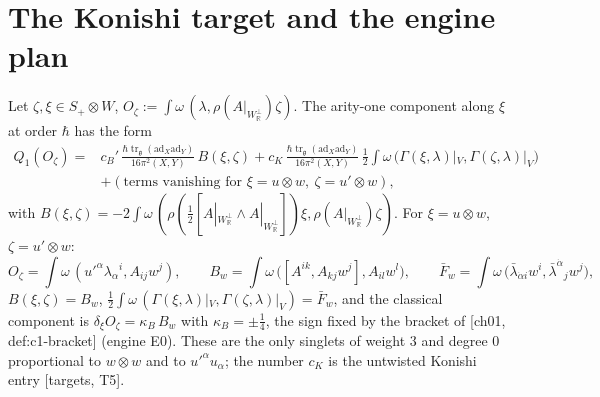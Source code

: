 \section{The Konishi target and the engine plan}

\begin{proposition}
\label{prop:o-konishi}
Let $\zeta,\xi\in S_+\otimes W$, $O_\zeta:=\int\omega\,(\lambda,\rho(A|_{W_{\mathbb R}^\perp})\zeta)$. The arity-one component along $\xi$ at order $\hbar$ has the form
\begin{equation}
\begin{aligned}
Q_1(O_\zeta)={}&c_B'\,\frac{\hbar\operatorname{tr}_{\mathfrak g}(\mathrm{ad}_X\mathrm{ad}_Y)}{16\pi^2(X,Y)}\,B(\xi,\zeta)+c_K\,\frac{\hbar\operatorname{tr}_{\mathfrak g}(\mathrm{ad}_X\mathrm{ad}_Y)}{16\pi^2(X,Y)}\,\tfrac12\int\omega\,\big(\Gamma(\xi,\lambda)|_V,\Gamma(\zeta,\lambda)|_V\big)\\
&+(\text{terms vanishing for }\xi=u\otimes w,\ \zeta=u'\otimes w),
\end{aligned}
\label{eq:o-konishi}
\end{equation}
with $B(\xi,\zeta)=-2\int\omega\,(\rho(\tfrac12[A|_{W_{\mathbb R}^\perp}\wedge A|_{W_{\mathbb R}^\perp}])\xi,\rho(A|_{W_{\mathbb R}^\perp})\zeta)$. For $\xi=u\otimes w$, $\zeta=u'\otimes w$:
\begin{equation}
O_\zeta=\int\omega\,(u'^\alpha\lambda_\alpha{}^i,A_{ij}w^j),\qquad B_w=\int\omega\,\big([A^{ik},A_{kj}w^j],A_{il}w^l\big),\qquad \bar F_w=\int\omega\,\big(\bar\lambda_{\dot\alpha i}w^i,\bar\lambda^{\dot\alpha}{}_jw^j\big),
\label{eq:o-BF}
\end{equation}
$B(\xi,\zeta)=B_w$, $\tfrac12\int\omega\,(\Gamma(\xi,\lambda)|_V,\Gamma(\zeta,\lambda)|_V)=\bar F_w$, and the classical component is $\delta_\xi O_\zeta=\kappa_B\,B_w$ with $\kappa_B=\pm\tfrac14$, the sign fixed by the bracket of [ch01, def:c1-bracket] (engine E0). These are the only singlets of weight $3$ and degree $0$ proportional to $w\otimes w$ and to $u'^\alpha u_\alpha$; the number $c_K$ is the untwisted Konishi entry [targets, T5].
\end{proposition}

